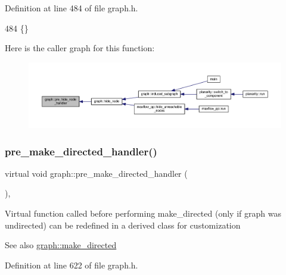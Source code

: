 Definition at line 484 of file graph.\+h.


\begin{DoxyCode}
484 \{\}          
\end{DoxyCode}
Here is the caller graph for this function\+:
\nopagebreak
\begin{figure}[H]
\begin{center}
\leavevmode
\includegraphics[width=350pt]{classgraph_ac169b1dca0b01c97e683302b3908fd49_icgraph}
\end{center}
\end{figure}
\mbox{\label{classgraph_a505198f412b1e426e9d09b62ea9811e8}} 
\subsubsection{\texorpdfstring{pre\+\_\+make\+\_\+directed\+\_\+handler()}{pre\_make\_directed\_handler()}}
{\footnotesize\ttfamily virtual void graph\+::pre\+\_\+make\+\_\+directed\+\_\+handler (\begin{DoxyParamCaption}{ }\end{DoxyParamCaption})\hspace{0.3cm}{\ttfamily [inline]}, {\ttfamily [virtual]}}

Virtual function called before performing make\+\_\+directed (only if graph was undirected) can be redefined in a derived class for customization

\begin{DoxySeeAlso}{See also}
\mbox{\hyperlink{classgraph_a1615678dee6248d6d8a00c553770b3bd}{graph\+::make\+\_\+directed}} 
\end{DoxySeeAlso}


Definition at line 622 of file graph.\+h.


